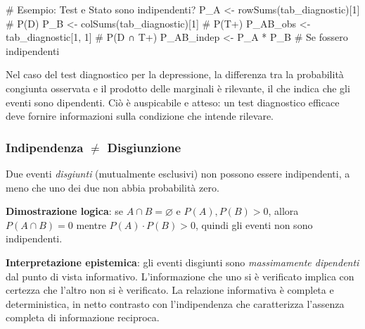 \documentclass[
  letterpaper,
  DIV=11,
  numbers=noendperiod,
  oneside]{scrreprt}
\newenvironment{Shaded}{\begin{snugshade}}{\end{snugshade}}
\newcommand{\CommentTok}[1]{\textcolor[rgb]{0.37,0.37,0.37}{#1}}
\newcommand{\DecValTok}[1]{\textcolor[rgb]{0.68,0.00,0.00}{#1}}
\newcommand{\FunctionTok}[1]{\textcolor[rgb]{0.28,0.35,0.67}{#1}}
\newcommand{\NormalTok}[1]{\textcolor[rgb]{0.00,0.23,0.31}{#1}}
\newcommand{\OtherTok}[1]{\textcolor[rgb]{0.00,0.23,0.31}{#1}}
\newcommand{\SpecialCharTok}[1]{\textcolor[rgb]{0.37,0.37,0.37}{#1}}
\theoremstyle{definition}
\theoremstyle{plain}
\theoremstyle{definition}
\theoremstyle{remark}
\begin{document}
\begin{Shaded}
\begin{Highlighting}[]
\CommentTok{\# Esempio: Test e Stato sono indipendenti?}
\NormalTok{P\_A }\OtherTok{\textless{}{-}} \FunctionTok{rowSums}\NormalTok{(tab\_diagnostic)[}\DecValTok{1}\NormalTok{]  }\CommentTok{\# P(D)}
\NormalTok{P\_B }\OtherTok{\textless{}{-}} \FunctionTok{colSums}\NormalTok{(tab\_diagnostic)[}\DecValTok{1}\NormalTok{]  }\CommentTok{\# P(T+)}
\NormalTok{P\_AB\_obs }\OtherTok{\textless{}{-}}\NormalTok{ tab\_diagnostic[}\DecValTok{1}\NormalTok{, }\DecValTok{1}\NormalTok{]   }\CommentTok{\# P(D ∩ T+)}
\NormalTok{P\_AB\_indep }\OtherTok{\textless{}{-}}\NormalTok{ P\_A }\SpecialCharTok{*}\NormalTok{ P\_B            }\CommentTok{\# Se fossero indipendenti}
\end{Highlighting}
\end{Shaded}

Nel caso del test diagnostico per la depressione, la differenza tra la
probabilità congiunta osservata e il prodotto delle marginali è
rilevante, il che indica che gli eventi sono dipendenti. Ciò è
auspicabile e atteso: un test diagnostico efficace deve fornire
informazioni sulla condizione che intende rilevare.

\begin{tcolorbox}[enhanced jigsaw, arc=.35mm, breakable, colbacktitle=quarto-callout-warning-color!10!white, opacityback=0, toprule=.15mm, rightrule=.15mm, colback=white, opacitybacktitle=0.6, leftrule=.75mm, coltitle=black, bottomtitle=1mm, left=2mm, toptitle=1mm, title=\textcolor{quarto-callout-warning-color}{\faExclamationTriangle}\hspace{0.5em}{Errore concettuale comune}, titlerule=0mm, bottomrule=.15mm, colframe=quarto-callout-warning-color-frame]

\subsubsection*{\texorpdfstring{Indipendenza \(\neq\)
Disgiunzione}{Indipendenza \textbackslash neq Disgiunzione}}\label{indipendenza-neq-disgiunzione}

Due eventi \emph{disgiunti} (mutualmente esclusivi) non possono essere
indipendenti, a meno che uno dei due non abbia probabilità zero.

\textbf{Dimostrazione logica}: se \(A \cap B = \varnothing\) e
\(P(A), P(B) > 0\), allora \(P(A \cap B) = 0\) mentre
\(P(A) \cdot P(B) > 0\), quindi gli eventi non sono indipendenti.

\textbf{Interpretazione epistemica}: gli eventi disgiunti sono
\emph{massimamente dipendenti} dal punto di vista informativo.
L'informazione che uno si è verificato implica con certezza che l'altro
non si è verificato. La relazione informativa è completa e
deterministica, in netto contrasto con l'indipendenza che caratterizza
l'assenza completa di informazione reciproca.

\end{tcolorbox}
\end{document}
